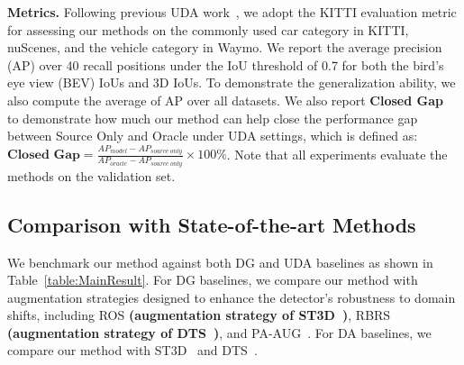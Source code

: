 
\textbf{Metrics.} Following previous UDA work~\cite{yang2021st3d}, we adopt the KITTI evaluation metric for assessing our methods on the commonly used car category in KITTI, nuScenes, and the vehicle category in Waymo. We report the average precision (AP) over 40 recall positions under the IoU threshold of 0.7 for both the bird’s eye view (BEV) IoUs and 3D IoUs. To demonstrate the generalization ability, we also compute the average of AP over all datasets. We also report \textbf{Closed Gap}~\cite{yang2021st3d} to demonstrate how much our method can help close the performance gap between Source Only and Oracle under UDA settings, which is defined as: $\textbf{Closed Gap} = \frac{AP_{model} - AP_{source~only}}{AP_{oracle} - AP_{source~only}} \times 100\% $. Note that all experiments evaluate the methods on the validation set. 


\subsection{Comparison with State-of-the-art Methods}
We benchmark our method against both DG and UDA baselines as shown in Table~\ref{table:MainResult}. For DG baselines, we compare our method with augmentation strategies designed to enhance the detector's robustness to domain shifts, including ROS \textbf{(augmentation strategy of ST3D~\cite{yang2021st3d})}, RBRS \textbf{(augmentation strategy of DTS~\cite{hu2023density})}, and PA-AUG~\cite{choi2021part}. For DA baselines, we compare our method with ST3D~\cite{yang2021st3d} and DTS~\cite{hu2023density}.

